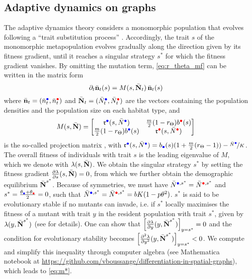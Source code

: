   \subsection{Adaptive dynamics on graphs}
  The adaptive dynamics theory considers a monomorphic population that evolves following a “trait substitution process” \cite{Meszena1997}. Accordingly, the trait $s$ of the monomorphic metapopulation evolves gradually along the direction given by its fitness gradient, until it reaches a singular strategy $s^*$ for which the fitness gradient vanishes. By omitting the mutation term, \cref{eq:r_theta_mf} can be written in the matrix form
  \begin{equation}
	\partial_t \bar{\textbf n}_t(s) = M(s, \bar{\textbf N}_t) \, \bar{\textbf n}_t(s)
  \end{equation}
  where $\bar{\textbf n}_t = (\bar{n}^{\bcirc}_t, \bar{n}^{\rcirc}_t)$ and
  $\bar{\textbf N}_t = (\bar{N}^{\bcirc}_t, \bar{N}^{\rcirc}_t)$ are the vectors containing the population densities and the population size on each habitat type, and
  \begin{equation}
  M(s, \bar{\textbf N}) = 
  \begin{bmatrix}
	\rr^{\bcirc}(s,\bar{N}^{\bcirc}) & \tfrac{m}{2} (1-r_\Theta)b^{\rcirc}(s) \\
	\tfrac{m}{2} (1-r_\Theta)b^{\bcirc}(s) & \rr^{\rcirc}(s,\bar{N}^{\rcirc})
  \end{bmatrix}
  \end{equation} 
  is the so-called projection matrix \cite{Meszena1997}, with 
  $\rr^{\bcirc}(s,\bar{N}^{\bcirc}) = b_{{\bcirc}}(s)(1+\tfrac{m}{2} (r_\Theta-1)) - \nicefrac{\bar{N}^{\bcirc}}{K}$. The overall fitness of individuals with trait $s$ is the leading eigenvalue of $M$, which we denote with $\lambda(s,\bar{\textbf N})$. We obtain the singular strategy $s^*$ by setting the fitness gradient $\frac{\partial \lambda}{\partial s} (s, \bar{\textbf N}) = 0$, from which we further obtain the demographic equilibrium $\bar{\textbf N}^{s^{*}}$. Because of symmetries, we must have $\bar{N}^{\bcirc,s^*} = \bar{N}^{\rcirc,s^*} $ and $s^* = \frac{\theta_{\bcirc} +\theta_{\rcirc}}{2} =0$, such that $\bar{N}^{\bcirc,s^*} = \bar{N}^{\rcirc,s^*} = bK(1 - p \theta^2)$. $s^*$ is said to be evolutionary stable if no mutants can invade, i.e. if $s^*$ locally maximises the fitness of a mutant with trait $y$ in the resident population with trait $s^*$, given by $\lambda(y, \bar{\textbf N}^{s^*})$ (see \cite{Meszena1997} for details). One can show that $\left[ \frac{\partial \lambda}{\partial y}(y, \bar{\textbf N}^{s^*}) \right]_{y = s^*} = 0$ and the condition for evolutionary stability becomes $ \left[ \frac{\partial^2 \lambda}{\partial y^2}(y, \bar{\textbf N}^{s^*}) \right]_{y = s^*} < 0 $. We compute and simplify this inequality through computer algebra (see Mathematica notebook at \href{https://github.com/vboussange/differentiation-in-spatial-graphs}{https://github.com/vboussange/differentiation-in-spatial-graphs}), which leads to \cref{eq:m*}.
  
